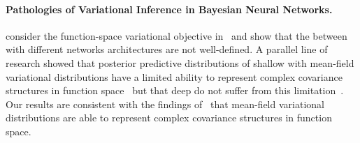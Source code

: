 \paragraph{Pathologies of Variational Inference in Bayesian Neural Networks.}
\citet{burt2021understanding} consider the function-space variational objective in~ and show that the \kld between \bnns with different networks architectures are not well-defined.
A parallel line of research showed that posterior predictive distributions of shallow \bnns with mean-field variational distributions have a limited ability to represent complex covariance structures in function space~\citep{foong2019inbetween,foong2020expressiveness} but that deep \bnns do not suffer from this limitation~\citep{farquhar2020liberty}.
Our results are consistent with the findings of~\citet{farquhar2020liberty} that mean-field variational distributions are able to represent complex covariance structures in function space.
%




%